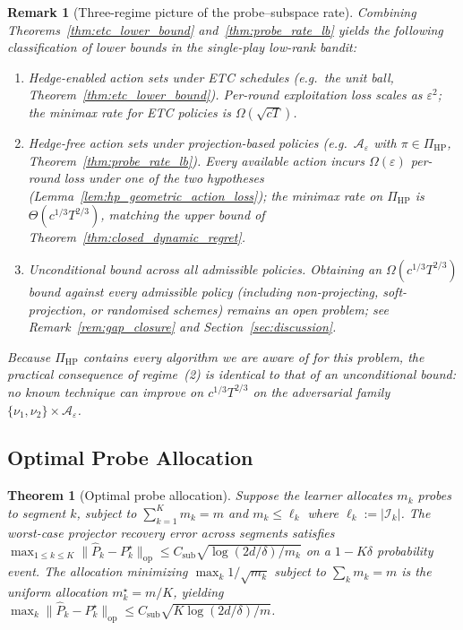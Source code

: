 \documentclass[11pt]{article}
\newcommand{\op}{\mathrm{op}}
\newcommand{\cA}{\mathcal{A}}
\newcommand{\cI}{\mathcal{I}}
\newtheorem{theorem}{Theorem}
\newtheorem{remark}{Remark}
\begin{document}
\begin{remark}[Three-regime picture of the probe--subspace rate]
\label{rem:three_regimes}
Combining Theorems~\ref{thm:etc_lower_bound} and~\ref{thm:probe_rate_lb}
yields the following classification of lower bounds in the single-play
low-rank bandit:
\begin{enumerate}[leftmargin=1.4em,itemsep=1pt]
\item \emph{Hedge-enabled action sets under ETC schedules
(e.g.\ the unit ball, Theorem~\ref{thm:etc_lower_bound}).}
Per-round exploitation loss scales as $\varepsilon^2$; the minimax rate
for ETC policies is $\Omega(\sqrt{cT})$.
\item \emph{Hedge-free action sets under projection-based policies
(e.g.\ $\cA_\varepsilon$ with $\pi\in\Pi_{\mathrm{HP}}$,
Theorem~\ref{thm:probe_rate_lb}).}
Every available action incurs $\Omega(\varepsilon)$ per-round loss under
one of the two hypotheses
(Lemma~\ref{lem:hp_geometric_action_loss}); the minimax rate on
$\Pi_{\mathrm{HP}}$ is $\Theta(c^{1/3}T^{2/3})$, matching the upper bound
of Theorem~\ref{thm:closed_dynamic_regret}.
\item \emph{Unconditional bound across all admissible policies.}
Obtaining an $\Omega(c^{1/3}T^{2/3})$ bound against every admissible
policy (including non-projecting, soft-projection, or randomised
schemes) remains an open problem; see Remark~\ref{rem:gap_closure} and
Section~\ref{sec:discussion}.
\end{enumerate}
Because $\Pi_{\mathrm{HP}}$ contains every algorithm we are aware of for
this problem, the practical consequence of regime~(2) is identical to
that of an unconditional bound: no known technique can improve on
$c^{1/3}T^{2/3}$ on the adversarial family
$\{\nu_1,\nu_2\}\times\cA_\varepsilon$.
\end{remark}

\subsection{Optimal Probe Allocation}
\label{sec:optimal_allocation}

\begin{theorem}[Optimal probe allocation]
\label{thm:optimal_allocation}
Suppose the learner allocates $m_k$ probes to segment $k$, subject to
$\sum_{k=1}^K m_k = m$ and $m_k \le \ell_k$ where $\ell_k := |\cI_k|$.
The worst-case projector recovery error across segments satisfies
$\max_{1 \le k \le K} \|\widehat{P}_k - P_k^\star\|_{\op}
\le C_{\mathrm{sub}} \sqrt{\log(2d/\delta)/m_k}$
on a $1-K\delta$ probability event.
The allocation minimizing $\max_k 1/\sqrt{m_k}$ subject to $\sum_k m_k = m$ is the
uniform allocation $m_k^\star = m/K$, yielding
$\max_k \|\widehat{P}_k - P_k^\star\|_{\op}
\le C_{\mathrm{sub}}\sqrt{K\log(2d/\delta) / m}$.
\end{theorem}
\end{document}
